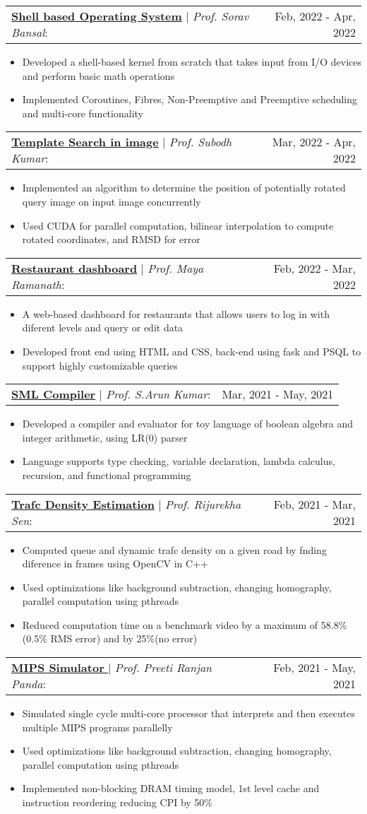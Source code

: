 \documentclass[letterpaper,11pt]{article}
\makeatletter
\newcommand{\resumeItem}[1]{
  \item\small{
    {#1 \vspace{-2pt}}
  }
}
\newcommand{\headingStart}{
  \begin{tabular*}{0.97\textwidth}[t]{l@{\extracolsep{\fill}}r}
}
\newcommand{\projectHeading}[3]{
    \item
    \headingStart
      \underline{\textbf{#1}} $|$ \textit{#2}: & #3 \\
    \end{tabular*}\vspace{-7pt}
}
\newcommand{\itemListStart}[1]
  {\begin{itemize}[leftmargin=#1in, rightmargin=0in]}
\newcommand{\itemListEnd}{\end{itemize}\vspace{-5pt}}
\makeatother
\begin{document}
      \projectHeading
        {Shell based Operating System}
        {Prof. Sorav Bansal}
        {Feb, 2022 - Apr, 2022}
        \itemListStart{0.2}
          \resumeItem{Developed a shell-based kernel from scratch that takes input from I/O devices and perform basic math operations}
          \resumeItem{Implemented Coroutines, Fibres, Non-Preemptive and Preemptive scheduling and multi-core functionality}
        \itemListEnd

      \projectHeading
        {Template Search in image}
        {Prof. Subodh Kumar}
        {Mar, 2022 - Apr, 2022}
        \itemListStart{0.2}
          \resumeItem{Implemented an algorithm to determine the position of potentially rotated query image on input image concurrently}
          \resumeItem{Used CUDA for parallel computation, bilinear interpolation to compute rotated coordinates, and RMSD for error}
        \itemListEnd

      \projectHeading
        {Restaurant dashboard}
        {Prof. Maya Ramanath}
        {Feb, 2022 - Mar, 2022}
        \itemListStart{0.2}
          \resumeItem{A web-based dashboard for restaurants that allows users to log in with diferent levels and query or edit data}
          \resumeItem{Developed front end using HTML and CSS, back-end using fask and PSQL to support highly customizable queries}
        \itemListEnd

      \projectHeading
        {SML Compiler}
        {Prof. S.Arun Kumar}
        {Mar, 2021 - May, 2021}
        \itemListStart{0.2}
          \resumeItem{Developed a compiler and evaluator for toy language of boolean algebra and integer arithmetic, using LR(0) parser}
          \resumeItem{Language supports type checking, variable declaration, lambda calculus, recursion, and functional programming}
        \itemListEnd

      \projectHeading
        {Trafc Density Estimation}
        {Prof. Rijurekha Sen}
        {Feb, 2021 - Mar, 2021}
        \itemListStart{0.2}
          \resumeItem{Computed queue and dynamic trafc density on a given road by fnding diference in frames using OpenCV in C++}
          \resumeItem{Used optimizations like background subtraction, changing homography, parallel computation using pthreads}
          \resumeItem{Reduced computation time on a benchmark video by a maximum of 58.8\% (0.5\% RMS error) and by 25\%(no error)}
        \itemListEnd

      \projectHeading
      {MIPS Simulator }
      {Prof. Preeti Ranjan Panda}
      {Feb, 2021 - May, 2021}
      \itemListStart{0.2}
        \resumeItem{Simulated single cycle multi-core processor that interprets and then executes multiple MIPS programs parallelly}
        \resumeItem{Used optimizations like background subtraction, changing homography, parallel computation using pthreads}
        \resumeItem{Implemented non-blocking DRAM timing model, 1st level cache and instruction reordering reducing CPI by 50\%}
      \itemListEnd
\end{document}
